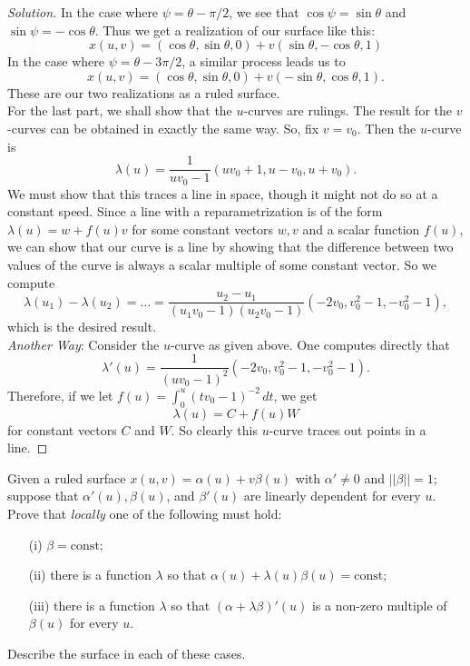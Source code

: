 \documentclass[Shifrin_Solutions_Spring_2018]{subfiles}
\begin{document}
\begin{proof}[Solution]
In the case where $\psi = \theta - \pi/2$, we see that $\cos\psi = \sin\theta$ and $\sin\psi = -\cos\theta$. Thus we get a realization of our surface like this:
\[
x(u,v) = \left( \cos\theta, \sin\theta , 0 \right) + v \left(\sin\theta , -\cos\theta, 1\right)
\]
In the case where $\psi = \theta - 3\pi/2$, a similar process leads us to
\[
x(u,v) = \left( \cos\theta, \sin\theta , 0 \right) + v \left(-\sin\theta , \cos\theta, 1\right).
\]
These are our two realizations as a ruled surface.\\

For the last part, we shall show that the $u$-curves are rulings. The result for the $v$-curves can be obtained in exactly the same way. So, fix $v= v_0$. Then the $u$-curve is
\[
\lambda(u) = \dfrac{1}{uv_0 -1}\left( uv_0 + 1 , u-v_0 , u+v_0\right).
\]
We must show that this traces a line in space, though it might not do so at a constant speed. Since a line with a reparametrization is of the form $\lambda(u) = w + f(u) v$ for some constant vectors $w, v$ and a scalar function $f(u)$, we can show that our curve is a line by showing that the difference between two values of the curve is always a scalar multiple of some constant vector. So we compute
\[
\lambda(u_1) - \lambda(u_2) = \dots = \dfrac{u_2-u_1}{(u_1v_0 -1)(u_2v_0-1)}\left( -2v_0 , v_0^2-1 , -v_0^2-1\right),
\]
which is the desired result.\\

\noindent\emph{Another Way}: Consider the $u$-curve as given above. One computes directly that
\[
\lambda'(u) = \dfrac{1}{(uv_0-1)^2} \left( -2v_0, v_0^2 - 1, -v_0^2-1\right).
\]
Therefore, if we let $f(u) = \int_0^u (tv_0-1)^{-2}\, dt$, we get
\[
\lambda(u) = C + f(u) W
\]
for constant vectors $C$ and $W$. So clearly this $u$-curve traces out points in a line.

\end{proof}



\begin{exercise}
Given a ruled surface $x(u,v) = \alpha(u) + v\beta(u)$ with $\alpha' \neq 0$ and $||\beta||=1$; suppose that $\alpha'(u), \beta(u)$, and $\beta'(u)$ are linearly dependent for every $u$. Prove that \emph{locally} one of the following must hold:
\begin{itemize}
\item[(i)] $\beta = \text{const}$;
\item[(ii)] there is a function $\lambda$ so that $\alpha(u) + \lambda(u) \beta(u) = \text{const}$;
\item[(iii)] there is a function $\lambda$ so that $(\alpha + \lambda \beta)'(u)$ is a non-zero multiple of $\beta(u)$ for every $u$.
\end{itemize}
Describe the surface in each of these cases.
\end{exercise}
\end{document}
